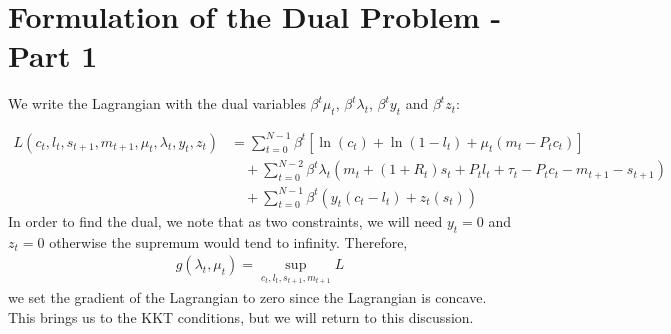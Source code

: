 \section*{Formulation of the Dual Problem - Part 1}\label{ch:ch3label}
We write the Lagrangian with the dual variables $\beta^t \mu_t$, $\beta^t \lambda_t$, $\beta^ty_t$ and $\beta^t z_t$:

\begin{align*}
L(c_t,l_t,s_{t+1},m_{t+1},\mu_{t},\lambda_t,y_t,z_t) &= \sum_{t=0}^{N-1}{\beta^t}[\ln(c_t)+\ln(1-l_t)+\mu_t(m_t- P_t c_t)]\\
&\quad+\sum_{t=0}^{N-2}{\beta^t}\lambda_t(m_t+(1+R_t)s_t+P_t l_t + \tau_t - P_t c_t - m_{t+1} - s_{t+1})\\
&\quad+\sum_{t=0}^{N-1}{\beta^t}(y_t(c_t-l_t)+z_t(s_t))
\end{align*}
In order to find the dual, we note that as two constraints, we will need $y_t=0$ and $z_t = 0$ otherwise the supremum would tend to infinity. Therefore,
\begin{align*}
g(\lambda_t,\mu_t) = \sup_{c_t,l_t,s_{t+1},m_{t+1}}L
\end{align*} we set the gradient of the Lagrangian to zero since the Lagrangian is concave. This brings us to the KKT conditions, but we will return to this discussion.